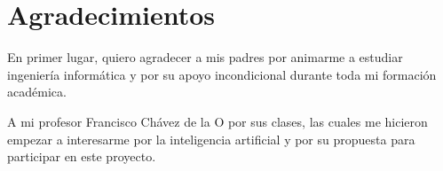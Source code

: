 \chapter*{Agradecimientos} 

En primer lugar, quiero agradecer a mis padres por animarme a estudiar ingeniería informática y por su apoyo incondicional durante toda mi formación académica.

A mi profesor Francisco Chávez de la O por sus clases, las cuales me hicieron empezar a interesarme por la inteligencia artificial y por su propuesta para participar en este proyecto.
